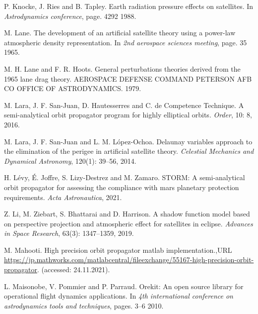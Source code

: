 \begin{CSLReferences}{1}{0}
\leavevmode{}%
P. Knocke, J. Ries and B. Tapley. Earth radiation pressure effects on satellites. In \emph{Astrodynamics conference}, page. 4292 1988.

\leavevmode{}%
M. Lane. The development of an artificial satellite theory using a power-law atmospheric density representation. In \emph{2nd aerospace sciences meeting}, page. 35 1965.

\leavevmode{}%
M. H. Lane and F. R. Hoots. General perturbations theories derived from the 1965 lane drag theory. AEROSPACE DEFENSE COMMAND PETERSON AFB CO OFFICE OF ASTRODYNAMICS. 1979.

\leavevmode{}%
M. Lara, J. F. San-Juan, D. Hautesserres and C. de Competence Technique. A semi-analytical orbit propagator program for highly elliptical orbits. \emph{Order}, 10: 8, 2016.

\leavevmode{}%
M. Lara, J. F. San-Juan and L. M. López-Ochoa. Delaunay variables approach to the elimination of the perigee in artificial satellite theory. \emph{Celestial Mechanics and Dynamical Astronomy}, 120(1): 39--56, 2014.

\leavevmode{}%
H. Lévy, É. Joffre, S. Lizy-Destrez and M. Zamaro. STORM: A semi-analytical orbit propagator for assessing the compliance with mars planetary protection requirements. \emph{Acta Astronautica}, 2021.

\leavevmode{}%
Z. Li, M. Ziebart, S. Bhattarai and D. Harrison. A shadow function model based on perspective projection and atmospheric effect for satellites in eclipse. \emph{Advances in Space Research}, 63(3): 1347--1359, 2019.

\leavevmode{}%
M. Mahooti. High precision orbit propagator matlab implementation.,URL \url{https://jp.mathworks.com/matlabcentral/fileexchange/55167-high-precision-orbit-propagator}. (accessed: 24.11.2021).

\leavevmode{}%
L. Maisonobe, V. Pommier and P. Parraud. Orekit: An open source library for operational flight dynamics applications. In \emph{4th international conference on astrodynamics tools and techniques}, pages. 3--6 2010.


\end{CSLReferences}
